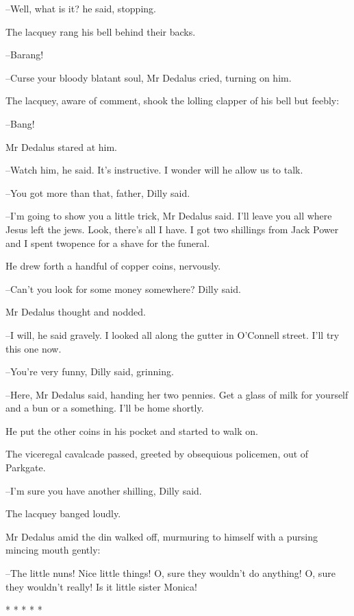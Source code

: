 --Well, what is it? he said, stopping.

The lacquey rang his bell behind their backs.

--Barang!

--Curse your bloody blatant soul,
Mr Dedalus cried, turning on him.

The lacquey, aware of comment,
shook the lolling clapper of his bell but feebly:

--Bang!

Mr Dedalus stared at him.

--Watch him, he said.
It's instructive.
I wonder will he allow us to talk.

--You got more than that, father, Dilly said.

--I'm going to show you a little trick, Mr Dedalus said. I'll leave you
all where Jesus left the jews. Look, there's all I have. I got two
shillings from Jack Power and I spent twopence for a shave for the
funeral.

He drew forth a handful of copper coins,
nervously.

--Can't you look for some money somewhere? Dilly said.

Mr Dedalus thought and nodded.

--I will, he said gravely. I looked all along the gutter in O'Connell
street. I'll try this one now.

--You're very funny, Dilly said, grinning.

--Here, Mr Dedalus said, handing her two pennies. Get a glass of milk for
yourself and a bun or a something. I'll be home shortly.

He put the other coins in his pocket and started to walk on.

The viceregal cavalcade passed,
greeted by obsequious policemen,
out of Parkgate.%

--I'm sure you have another shilling, Dilly said.

The lacquey banged loudly.

Mr Dedalus amid the din walked off, murmuring to himself with a
pursing mincing mouth gently:

--The little nuns! Nice little things! O, sure they wouldn't do anything!
O, sure they wouldn't really! Is it little sister Monica!


    * * * * *


